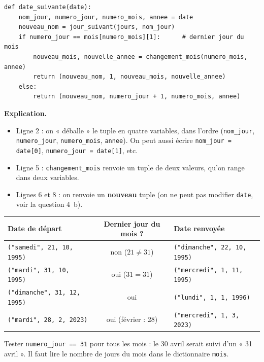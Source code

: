 \documentclass[11pt, a4paper]{exam}
\newcommand{\code}[1]{\texttt{#1}}
\newcommand{\explication}{\noindent\textbf{Explication.}\ }
\begin{document}
\begin{reponse}
\begin{lstlisting}
def date_suivante(date):
    nom_jour, numero_jour, numero_mois, annee = date
    nouveau_nom = jour_suivant(jours, nom_jour)
    if numero_jour == mois[numero_mois][1]:      # dernier jour du mois
        nouveau_mois, nouvelle_annee = changement_mois(numero_mois, annee)
        return (nouveau_nom, 1, nouveau_mois, nouvelle_annee)
    else:
        return (nouveau_nom, numero_jour + 1, numero_mois, annee)
\end{lstlisting}
\end{reponse}

\explication
\begin{itemize}
\item Ligne 2 : on « déballe » le tuple en quatre variables, dans l'ordre (\code{nom\_jour}, \code{numero\_jour}, \code{numero\_mois}, \code{annee}). On peut aussi écrire \code{nom\_jour = date[0]}, \code{numero\_jour = date[1]}, etc.
\item Ligne 5 : \code{changement\_mois} renvoie un tuple de deux valeurs, qu'on range dans deux variables.
\item Lignes 6 et 8 : on renvoie un \textbf{nouveau} tuple (on ne peut pas modifier \code{date}, voir la question 4~b).
\end{itemize}

\begin{center}\small
\begin{tabular}{|l|c|l|}\hline
Date de départ & Dernier jour du mois ? & Date renvoyée \\\hline
\code{("samedi", 21, 10, 1995)} & non ($21 \neq 31$) & \code{("dimanche", 22, 10, 1995)} \\\hline
\code{("mardi", 31, 10, 1995)} & oui ($31 = 31$) & \code{("mercredi", 1, 11, 1995)} \\\hline
\code{("dimanche", 31, 12, 1995)} & oui & \code{("lundi", 1, 1, 1996)} \\\hline
\code{("mardi", 28, 2, 2023)} & oui (février : 28) & \code{("mercredi", 1, 3, 2023)} \\\hline
\end{tabular}
\end{center}

\begin{erreur}
Tester \code{numero\_jour == 31} pour tous les mois : le 30 avril serait suivi d'un « 31 avril ». Il faut lire le nombre de jours du mois dans le dictionnaire \code{mois}.
\end{erreur}
\end{document}
